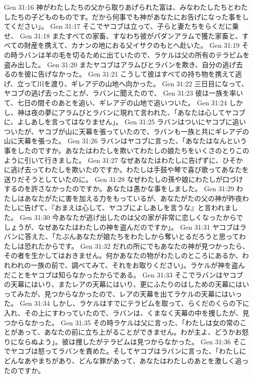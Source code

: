 Gen 31:16  神がわたしたちの父から取りあげられた富は、みなわたしたちとわたしたちの子どものものです。だから何事でも神があなたにお告げになった事をしてください」。
Gen 31:17  そこでヤコブは立って、子らと妻たちをらくだに乗せ、
Gen 31:18  またすべての家畜、すなわち彼がパダンアラムで獲た家畜と、すべての財産を携えて、カナンの地におる父イサクのもとへ赴いた。
Gen 31:19  その時ラバンは羊の毛を切るために出ていたので、ラケルは父の所有のテラピムを盗み出した。
Gen 31:20  またヤコブはアラムびとラバンを欺き、自分の逃げ去るのを彼に告げなかった。
Gen 31:21  こうして彼はすべての持ち物を携えて逃げ、立って川を渡り、ギレアデの山地へ向かった。
Gen 31:22  三日目になって、ヤコブの逃げ去ったことが、ラバンに聞えたので、
Gen 31:23  彼は一族を率いて、七日の間そのあとを追い、ギレアデの山地で追いついた。
Gen 31:24  しかし、神は夜の夢にアラムびとラバンに現れて言われた、「あなたは心してヤコブに、よしあしを言ってはなりません」。
Gen 31:25  ラバンはついにヤコブに追いついたが、ヤコブが山に天幕を張っていたので、ラバンも一族と共にギレアデの山に天幕を張った。
Gen 31:26  ラバンはヤコブに言った、「あなたはなんという事をしたのですか。あなたはわたしを欺いてわたしの娘たちをいくさのとりこのように引いて行きました。
Gen 31:27  なぜあなたはわたしに告げずに、ひそかに逃げ去ってわたしを欺いたのですか。わたしは手鼓や琴で喜び歌ってあなたを送りだそうとしていたのに。
Gen 31:28  なぜわたしの孫や娘にわたしが口づけするのを許さなかったのですか。あなたは愚かな事をしました。
Gen 31:29  わたしはあなたがたに害を加える力をもっているが、あなたがたの父の神が昨夜わたしに告げて、『おまえは心して、ヤコブによしあしを言うな』と言われました。
Gen 31:30  今あなたが逃げ出したのは父の家が非常に恋しくなったからでしょうが、なぜあなたはわたしの神を盗んだのですか」。
Gen 31:31  ヤコブはラバンに答えた、「たぶんあなたが娘たちをわたしから奪いとるだろうと思ってわたしは恐れたからです。
Gen 31:32  だれの所にでもあなたの神が見つかったら、その者を生かしてはおきません。何かあなたの物がわたしのところにあるか、われわれの一族の前で、調べてみて、それをお取りください」。ラケルが神を盗んだことをヤコブは知らなかったからである。
Gen 31:33  そこでラバンはヤコブの天幕にはいり、またレアの天幕にはいり、更にふたりのはしための天幕にはいってみたが、見つからなかったので、レアの天幕を出てラケルの天幕にはいった。
Gen 31:34  しかし、ラケルはすでにテラピムを取って、らくだのくらの下に入れ、その上にすわっていたので、ラバンは、くまなく天幕の中を捜したが、見つからなかった。
Gen 31:35  その時ラケルは父に言った、「わたしは女の常のことがあって、あなたの前に立ち上がることができません。わが主よ、どうかお怒りにならぬよう」。彼は捜したがテラピムは見つからなかった。
Gen 31:36  そこでヤコブは怒ってラバンを責めた。そしてヤコブはラバンに言った、「わたしにどんなあやまちがあり、どんな罪があって、あなたはわたしのあとを激しく追ったのですか。
